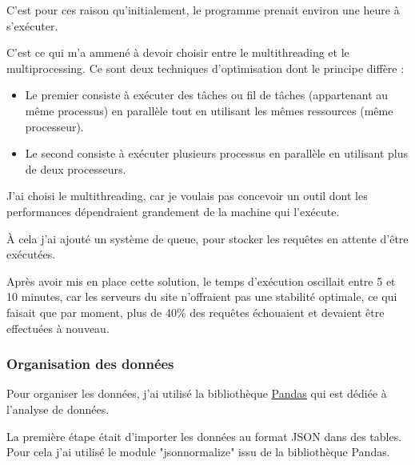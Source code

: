 C'est pour ces raison qu'initialement, le programme prenait environ une heure à s'exécuter.

C'est ce qui m'a ammené à devoir choisir entre le multithreading et le multiprocessing. Ce sont deux techniques d'optimisation dont le principe diffère :
\begin{itemize}
\item Le premier consiste à exécuter des tâches ou fil de tâches (appartenant au même processus) en parallèle tout en utilisant les mêmes ressources (même processeur).
\item Le second consiste à exécuter plusieurs processus en parallèle en utilisant plus de deux processeurs.
\end{itemize}

J'ai choisi le multithreading, car je voulais pas concevoir un outil dont les performances dépendraient grandement de la machine qui l'exécute. 

À cela j'ai ajouté un système de queue, pour stocker les requêtes en attente d'être exécutées.

Après avoir mis en place cette solution, le temps d'exécution oscillait entre 5 et 10 minutes, car les serveurs du site n'offraient pas une stabilité optimale, ce qui faisait que par moment, plus de 40\% des requêtes échouaient et devaient être effectuées à nouveau. 

\subsubsection{Organisation des données}

Pour organiser les données, j'ai utilisé la bibliothèque \underline{\href{https://pandas.pydata.org}{Pandas}} qui est dédiée à l'analyse de données.

La première étape était d'importer les données au format JSON dans des tables. Pour cela j'ai utilisé le module "jsonnormalize" issu de la bibliothèque Pandas.

